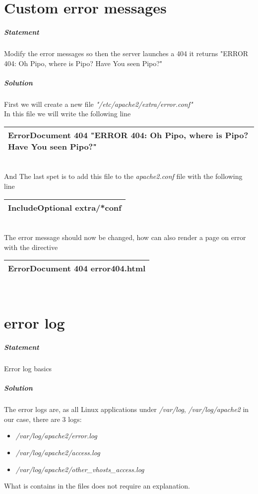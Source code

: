 \documentclass[a4paper,10pt]{article}
\begin{document}
\section{Custom error messages}
\subparagraph{Statement}
Modify the error messages so then the server launches a 404 it returns "ERROR 404: Oh Pipo, where is Pipo? Have You seen Pipo?"
\subparagraph{Solution}
First we will create a new file {\it "/etc/apache2/extra/error.conf"}\\
In this file we will write the following line
\vspace{0.5cm}\\\begin{tabular}{|l|}\hline
ErrorDocument 404 "ERROR 404: Oh Pipo, where is Pipo? Have You seen Pipo?"
\\\hline\end{tabular}\vspace{0.5cm}\\
And The last spet is to add this file to the {\it apache2.conf} file with the following line
\vspace{0.5cm}\\\begin{tabular}{|l|}\hline
IncludeOptional extra/*conf
\\\hline\end{tabular}\vspace{0.5cm}\\
The error message should now be changed, how can also render a page on error with the directive
\vspace{0.5cm}\\\begin{tabular}{|l|}\hline
ErrorDocument 404 error404.html
\\\hline\end{tabular}\vspace{0.5cm}\\

\section{error log}
\subparagraph{Statement}
Error log basics
\subparagraph{Solution}
The error logs are, as all Linux applications under {\it /var/log}, {\it /var/log/apache2} in our case, there are 3 logs:
\begin{itemize}
  \item {\it /var/log/apache2/error.log}
  \item {\it /var/log/apache2/access.log}
  \item {\it /var/log/apache2/other\_vhosts\_access.log}
\end{itemize}
What is contains in the files does not require an explanation.
\pagebreak
\end{document}
